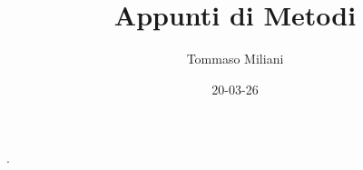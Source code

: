 \documentclass[a4paper, oneside]{article}
\title{Appunti di Metodi}
\author{Tommaso Miliani}
\date{20-03-26}
\begin{document}
                {}          %
                {}          %
                {\slshape}  %
                {}          %
                {\bfseries} %
                {.}         %
                {\newline}  %
                {}          %
\theoremstyle{theoremEnv}

\newtheorem{definition}{Definizione}[section]
\newtheorem{theorem}{Teorema}[section]
\newtheorem{lemma}{Proposizione}[section]
\newtheorem{observation}{Osservazione}[section]
\newtheorem{corollary}{Corollario}[theorem]
\newtheorem{example}{Esempio}[section]
\newtheorem{remark}{Enunciato}[section]

\maketitle
\end{document}
